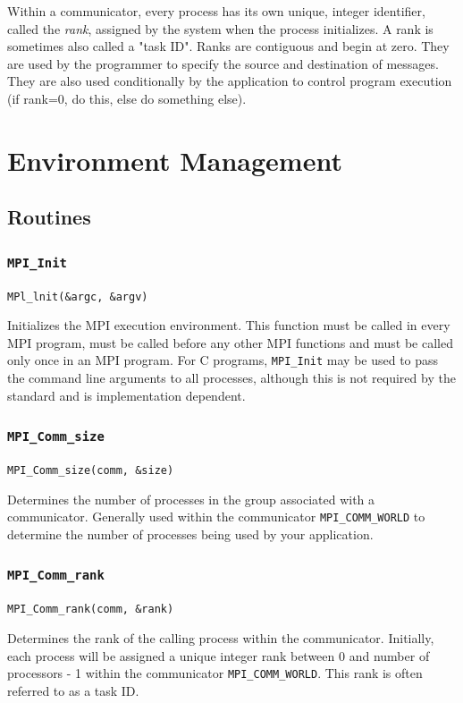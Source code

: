 Within a communicator, every process has its own unique, integer identifier, called the \textit{rank}, assigned by the system when the process initializes. A rank is sometimes also called a "task ID". Ranks are contiguous and begin at zero.  They are used by the programmer to specify the source and destination of messages. They are also used conditionally by the application to control program execution (if rank=0, do this, else do something else).

\section{Environment Management}
\subsection{Routines \footnotemark}

\subsubsection{\texttt{MPI\_Init} }
\texttt{MPl\_lnit(\&argc, \&argv) }

Initializes the MPI execution environment. This function must be called in every MPI program, must be called before any other MPI functions and must be called only once in an MPI program. For C programs, \texttt{MPI\_Init} may be used to pass the command line arguments to all processes, although this is not required by the standard and is implementation dependent. 


\subsubsection{\texttt{MPI\_Comm\_size }}
\texttt{MPI\_Comm\_size(comm, \&size) }

Determines the number of processes in the group associated with a communicator. 
Generally used within the communicator \texttt{MPI\_COMM\_WORLD} to determine the number of processes being used by your application. 

\subsubsection{\texttt{MPI\_Comm\_rank}}
\texttt{MPI\_Comm\_rank(comm, \&rank) }

Determines the rank of the calling process within the communicator. Initially, each process will be assigned a unique integer rank between 0 and number of processors - 1 within the communicator \texttt{MPI\_COMM\_WORLD}. This rank is often referred to as a task ID.

